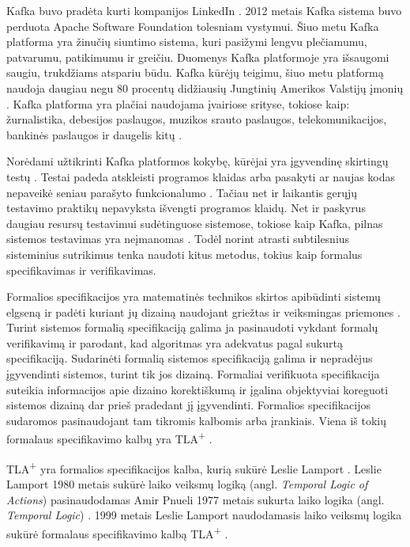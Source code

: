 \documentclass{VUMIFPSmagistrinis}
\begin{document}
 		Kafka buvo pradėta kurti kompanijos LinkedIn \cite{kfk}.
		2012 metais Kafka sistema buvo perduota Apache Software Foundation tolesniam vystymui.
		Šiuo metu Kafka platforma yra žinučių siuntimo sistema, kuri pasižymi lengvu plečiamumu, patvarumu, patikimumu ir greičiu.
		Duomenys Kafka platformoje yra išsaugomi saugiu, trukdžiams atspariu būdu.
		Kafka kūrėjų teigimu, šiuo metu platformą naudoja daugiau negu 80 procentų didžiausių Jungtinių Amerikos Valstijų įmonių \cite{kfk}.
		Kafka platforma yra plačiai naudojama įvairiose srityse, tokiose kaip: žurnalistika, debesijos paslaugos, muzikos srauto paslaugos, telekomunikacijos, bankinės paslaugos ir daugelis kitų \cite{kfk}.


		Norėdami užtikrinti Kafka platformos kokybę, kūrėjai yra įgyvendinę skirtingų testų \cite{kfkGH}.
		Testai padeda atskleisti programos klaidas arba pasakyti ar naujas kodas nepaveikė seniau parašyto funkcionalumo \cite{819971}.
		Tačiau net ir laikantis gerųjų testavimo praktikų nepavyksta išvengti programos klaidų.
		Net ir paskyrus daugiau resursų testavimui sudėtinguose sistemose, tokiose kaip Kafka, pilnas sistemos testavimas yra neįmanomas \cite{sullivan2004software}.
		Todėl norint atrasti subtilesnius sisteminius sutrikimus tenka naudoti kitus metodus, tokius kaip formalus specifikavimas ir verifikavimas.


		Formalios specifikacijos yra matematinės technikos skirtos apibūdinti sistemų elgseną ir padėti kuriant jų dizainą naudojant griežtas ir veiksmingas priemones \cite{holzmann1995improvement}.
		Turint sistemos formalią specifikaciją galima ja pasinaudoti vykdant formalų verifikavimą ir parodant, kad algoritmas yra adekvatus pagal sukurtą specifikaciją.
		Sudarinėti formalią sistemos specifikaciją galima ir nepradėjus įgyvendinti sistemos, turint tik jos dizainą. 
		Formaliai verifikuota specifikacija suteikia informacijos apie dizaino korektiškumą ir įgalina objektyviai koreguoti sistemos dizainą dar prieš pradedant jį įgyvendinti.
		Formalios specifikacijos sudaromos pasinaudojant tam tikromis kalbomis arba įrankiais.
		Viena iš tokių formalaus specifikavimo kalbų yra TLA\textsuperscript{+} \cite{lamport2002specifying}.
		

		TLA\textsuperscript{+} yra formalios specifikacijos kalba, kurią sukūrė Leslie Lamport \cite{lamport2002specifying}.
		Leslie Lamport 1980 metais sukūrė laiko veiksmų logiką (angl. {\it Temporal Logic of Actions}) \cite{10.1145/177492.177726} pasinaudodamas Amir Pnueli 1977 metais sukurta laiko logika (angl. {\it Temporal Logic}) \cite{4567924}.
		1999 metais Leslie Lamport naudodamasis laiko veiksmų logika sukūrė formalaus specifikavimo kalbą TLA\textsuperscript{+} \cite{lamport2002specifying}.
		
\end{document}
